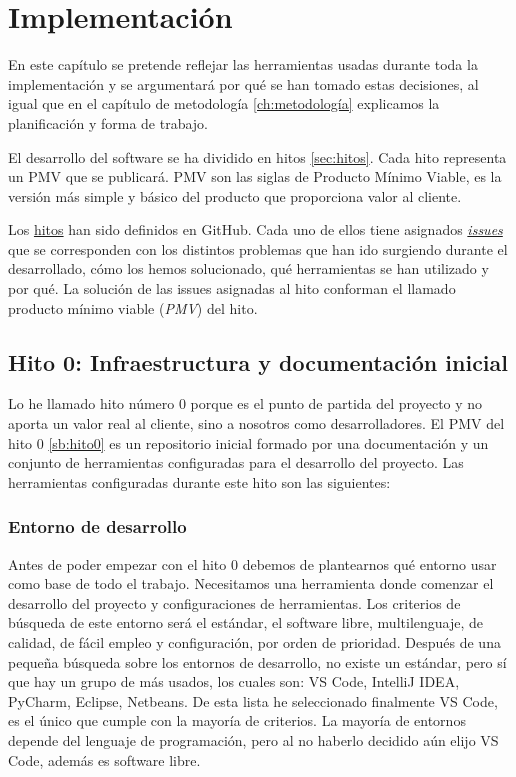 \UseRawInputEncoding
\chapter{Implementación}

En este capítulo se pretende reflejar las herramientas usadas durante toda la implementación y
se argumentará por qué se han tomado estas decisiones, al igual que en el capítulo de metodología \ref{ch:metodología} explicamos
la planificación y forma de trabajo.

El desarrollo del software se ha dividido en hitos \ref*{sec:hitos}. Cada hito representa un PMV que se publicará.
PMV son las siglas de Producto Mínimo Viable, es la versión más simple y básico del producto que proporciona valor al cliente.

Los \href{https://github.com/RubenDelgadoPareja/TFG-Triage-Inteligente-Consulta-Medica/milestones}{hitos} han sido definidos en GitHub.
Cada uno de ellos tiene asignados \href{https://github.com/RubenDelgadoPareja/TFG-Triage-Inteligente-Consulta-Medica/issues}{\textit{issues}} que se corresponden
con los distintos problemas que han ido surgiendo durante el desarrollado, cómo los hemos solucionado, qué herramientas se han utilizado y por qué.
La solución de las issues asignadas al hito conforman el llamado producto mínimo viable (\textit{PMV}) del hito.

\section{Hito 0: Infraestructura y documentación inicial}

Lo he llamado hito número 0 porque es el punto de partida del proyecto y no aporta un valor real al cliente, sino a nosotros como desarrolladores.
El PMV del hito 0 \ref{sb:hito0} es un repositorio inicial formado por una documentación y un conjunto de herramientas configuradas para el desarrollo del proyecto.
Las herramientas configuradas durante este hito son las siguientes:

\subsection{Entorno de desarrollo}
Antes de poder empezar con el hito 0 debemos de plantearnos qué entorno usar como base de todo el trabajo.
Necesitamos una herramienta donde comenzar el desarrollo del proyecto y configuraciones de herramientas.
Los criterios de búsqueda de este entorno será el estándar, el software libre, multilenguaje, de calidad, de fácil empleo y configuración, por orden de prioridad.
Después de una pequeña búsqueda sobre los entornos de desarrollo, no existe un estándar, pero sí que hay un grupo de más usados, los cuales son: VS Code, IntelliJ IDEA, PyCharm, Eclipse, Netbeans.
De esta lista he seleccionado finalmente VS Code, es el único que cumple con la mayoría de criterios. La mayoría de entornos depende del lenguaje de programación, pero al no haberlo
decidido aún elijo VS Code, además es software libre.

